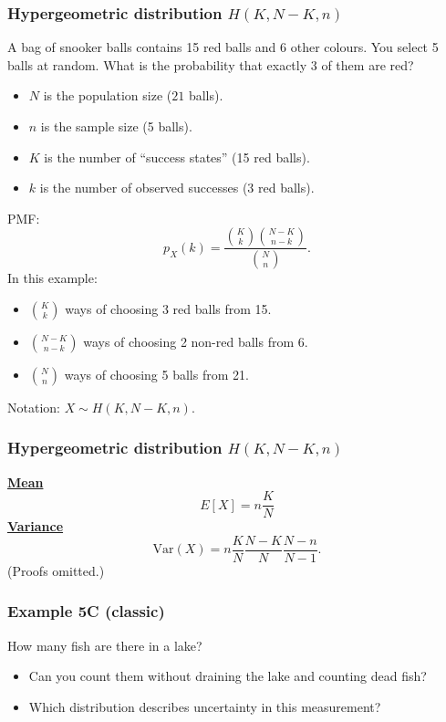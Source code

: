 \documentclass[t,8pt]{beamer}
\begin{document}
\begin{frame}
	\frametitle{Hypergeometric distribution $H(K,N-K,n)$}
	{\color{gray}
		A bag of snooker balls contains 15 red balls and 6 other colours. You select 5 balls at random. What is the probability that exactly 3 of them are red?\\[6pt]
	}
	\begin{itemize}
		\item $N$ is the population size ($21$ balls).
		\item $n$ is the sample size (5 balls).
		\item $K$ is the number of ``success states'' (15 red balls).
		\item $k$ is the number of observed successes (3 red balls).
	\end{itemize}
	PMF:
	\[
	p_X(k)=\frac{{K\choose k}{N-K\choose n-k}}{{N\choose n}}.
	\]
	In this example:
	\begin{itemize}
		\item ${K\choose k}$ ways of choosing 3 red balls from 15.
		\item ${N-K\choose n-k}$ ways of choosing 2 non-red balls from 6.
		\item ${N\choose n}$ ways of choosing 5 balls from 21.
	\end{itemize}
	Notation: $X\sim H(K,N-K,n)$.
\end{frame}

\begin{frame}
	\frametitle{Hypergeometric distribution $H(K,N-K,n)$}
	{\bf\underline{Mean}}
	\[
	E[X]=n\frac{K}{N}
	\]
	{\bf\underline{Variance}}
	\[
	\mathrm{Var}(X)
	=n\frac{K}{N}\frac{N-K}{N}\frac{N-n}{N-1}.
	\]
	(Proofs omitted.) \par
\end{frame}

\begin{frame}
	\frametitle{Example 5C (classic)}
	How many fish are there in a lake?
	\begin{itemize}
		\item Can you count them without draining the lake and counting dead fish?
		\item Which distribution describes uncertainty in this measurement?
	\end{itemize}
\end{frame}
\end{document}
